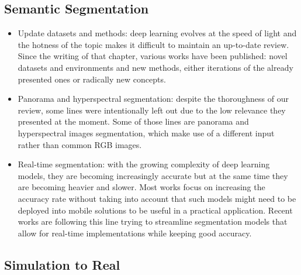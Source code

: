 \subsection{Semantic Segmentation}

\begin{itemize}
    \item Update datasets and methods: deep learning evolves at the speed of light and the hotness of the topic makes it difficult to maintain an up-to-date review. Since the writing of that chapter, various works have been published: novel datasets and environments and new methods, either iterations of the already presented ones or radically new concepts.
    \item Panorama and hyperspectral segmentation: despite the thoroughness of our review, some lines were intentionally left out due to the low relevance they presented at the moment. Some of those lines are panorama and hyperspectral images segmentation, which make use of a different input rather than common \ac{RGB} images.
    \item Real-time segmentation: with the growing complexity of deep learning models, they are becoming increasingly accurate but at the same time they are becoming heavier and slower. Most works focus on increasing the accuracy rate without taking into account that such models might need to be deployed into mobile solutions to be useful in a practical application. Recent works are following this line trying to streamline segmentation models that allow for real-time implementations while keeping good accuracy.
\end{itemize}

\subsection{Simulation to Real}


